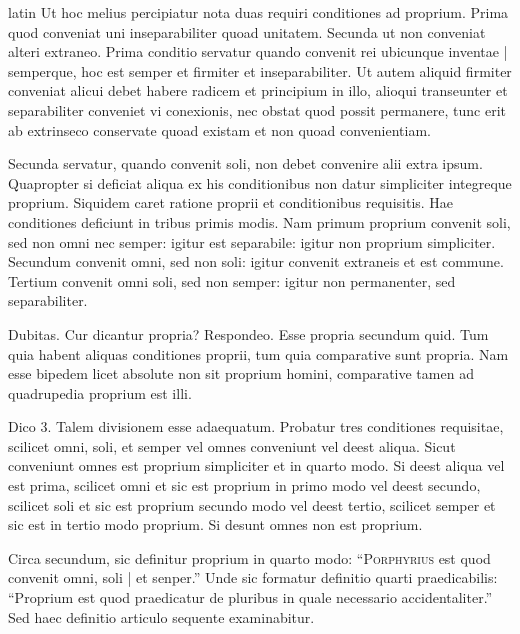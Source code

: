 \begin{otherlanguage*}{latin}
\pstart
Ut hoc melius percipiatur nota duas requiri conditiones ad proprium. Prima quod conveniat uni inseparabiliter quoad unitatem. Secunda ut non conveniat alteri extraneo. Prima conditio servatur quando convenit rei ubicunque inventae \textnormal{|} semperque, hoc est semper et firmiter et inseparabiliter. Ut autem aliquid firmiter conveniat alicui debet habere radicem et principium in illo, alioqui transeunter et separabiliter conveniet vi conexionis, nec obstat quod possit permanere, tunc erit ab extrinseco conservate quoad existam et non quoad convenientiam. 
\pend

\pstart
Secunda servatur, quando convenit soli, non debet convenire alii extra ipsum. Quapropter si deficiat aliqua ex his conditionibus non datur simpliciter integreque proprium. Siquidem caret ratione proprii et conditionibus requisitis. Hae conditiones deficiunt in tribus primis modis. Nam primum proprium convenit soli, sed non omni nec semper:
igitur est separabile:
igitur non proprium simpliciter. Secundum convenit omni, sed non soli:
igitur convenit extraneis et est commune. Tertium convenit omni soli, sed non semper:
igitur non permanenter, sed separabiliter. 
\pend

\pstart
Dubitas. Cur dicantur propria? Respondeo. Esse propria secundum quid. Tum quia habent aliquas conditiones proprii, tum quia comparative sunt propria. Nam esse bipedem licet absolute non sit proprium homini, comparative tamen ad quadrupedia proprium est illi. 
\pend

\pstart
Dico 3. Talem divisionem esse adaequatum. Probatur tres conditiones requisitae, scilicet omni, soli, et semper vel omnes conveniunt vel deest aliqua. Sicut conveniunt omnes est proprium simpliciter et in quarto modo. Si deest aliqua vel est prima, scilicet omni et sic est proprium in primo modo vel deest secundo, scilicet soli et sic est proprium secundo modo vel deest tertio, scilicet semper et sic est in tertio modo proprium. Si desunt omnes non est proprium. 
\pend

\pstart
Circa secundum, sic definitur proprium in quarto modo:
\enquote{\textsc{Porphyrius} est quod convenit omni, soli \textnormal{|} et senper.} Unde sic formatur definitio quarti praedicabilis:
\enquote{Proprium est quod praedicatur de pluribus in quale necessario accidentaliter.} Sed haec definitio articulo sequente examinabitur. 
\pend


\end{otherlanguage*}
